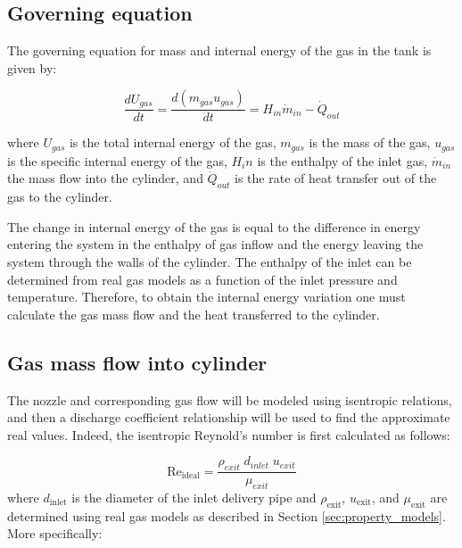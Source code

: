 


\subsection{Governing equation}

The governing equation for mass and internal energy of the gas in the tank is given by:

\begin{equation}
\frac{dU_{gas}}{dt} = \frac{d\left(m_{gas}u_{gas}\right)}{dt} = H_{in}\dot m_{in} - \dot Q_{out}
\end{equation}


\noindent where $U_{gas}$ is the total internal energy of the gas, $m_{gas}$ is the mass of the gas, $u_{gas}$ is the specific internal energy of the gas, $H_in$ is the enthalpy of the inlet gas, $\dot m_{in}$ the mass flow into the cylinder, and $\dot Q_{out}$ is the rate of heat transfer out of the gas to the cylinder.

The change in internal energy of the gas is equal to the difference in energy entering the system in the enthalpy of gas inflow and the energy leaving the system through the walls of the cylinder. The enthalpy of the inlet can be determined from real gas models as a function of the inlet pressure and temperature. Therefore, to obtain the internal energy variation one must calculate the gas mass flow and the heat transferred to the cylinder.



\subsection{Gas mass flow into cylinder}

The nozzle and corresponding gas flow will be modeled using isentropic relations, and then a discharge coefficient relationship will be used to find the approximate real values. Indeed, the isentropic Reynold's number is first calculated as follows:

\begin{equation}
\label{equ:reynoldsIdeal}
\text{Re}_{\text{ideal}} = \frac{\rho_{exit}\;d_{inlet}\;u_{exit}}{\mu_{exit}}
\end{equation}
where $d_{\text{inlet}}$ is the diameter of the inlet delivery pipe and  $\rho_{\text{exit}}$, $u_{\text{exit}}$, and $\mu_{\text{exit}}$ are determined using real gas models as described in Section \ref{sec:property_models}. More specifically:

